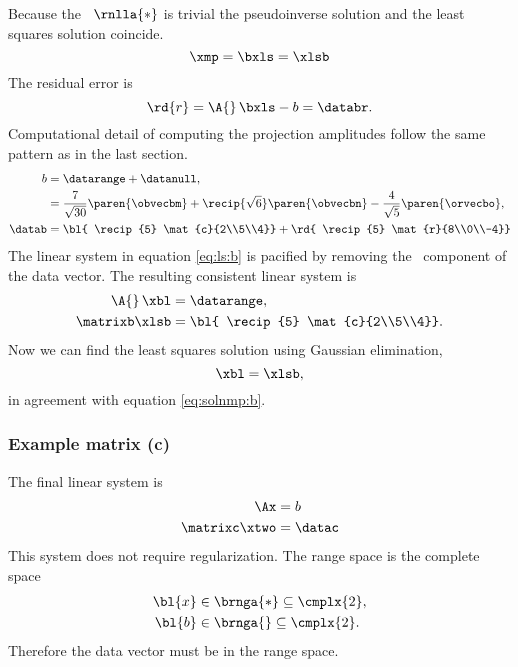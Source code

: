 Because the \ns\ $\rnlla{*}$ is trivial the pseudoinverse solution and the least squares solution coincide.
%
\begin{equation}
  \xmp = \bxls = \xlsb
  \label{eq:solnmp:b}
\end{equation}
%
The residual error is
%
\begin{equation}
  {\rd{ r }} = \A{}\,\bxls - b = \databr.
\end{equation}
%
Computational detail of computing the projection amplitudes follow the same pattern as in the last section.
%
\begin{equation}
  \begin{split}
     b &= \datarange + \datanull, \\
       &= \frac{7}{\sqrt{30}} \paren{\obvecbm}  + \recip{\sqrt{6}} \paren{\obvecbn}  - \frac{4}{\sqrt{5}} \paren{\orvecbo} , \\
     \datab &= {\bl{ \recip{5} \mat{c}{2\\5\\4}}} + {\rd{ \recip{5} \mat{r}{8\\0\\-4}}}
  \end{split}
  \label{eq:regularize:b}
\end{equation}
%
The linear system in equation \eqref{eq:ls:b} is pacified by removing the \ns\ component of the data vector. The resulting consistent linear system is
\begin{equation}
  \begin{split}
    \A{}\, \xbl &= \datarange, \\
    \matrixb \xlsb &= {\bl{ \recip{5} \mat{c}{2\\5\\4}}} .
  \end{split}
\end{equation}
Now we can find the least squares solution using Gaussian elimination,
%
\begin{equation}
  \xbl = \xlsb,
\end{equation}
in agreement with equation \eqref{eq:solnmp:b}.

\subsubsection{Example matrix (c)}
The final linear system is
\begin{equation}
  \begin{split}
    \Ax &= b \\
    \matrixc \xtwo &= \datac
  \end{split}
\end{equation}
%
This system does not require regularization. The range space is the complete space
%
\begin{equation}
  \begin{split}
    {\bl{ x }} &\in \brnga{*} \subseteq \cmplx{2}, \\
    {\bl{ b }} &\in \brnga{} \subseteq \cmplx{2}.
  \end{split}
\end{equation}
Therefore the data vector must be in the range space.

